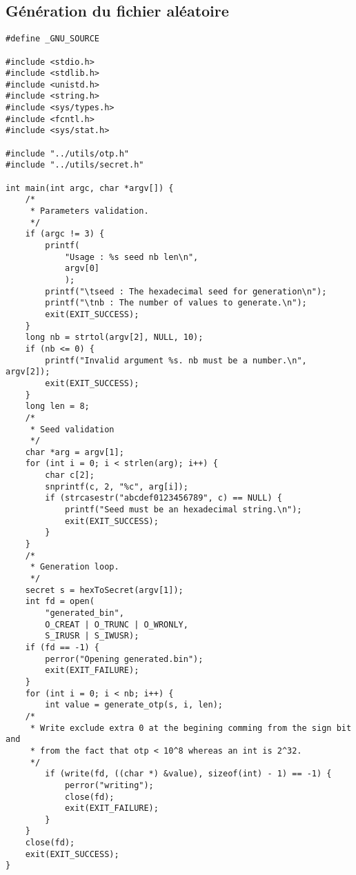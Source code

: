 \documentclass{"../../res/univ-projet"}
\begin{document}
	\newpage
	\begin{appendices}
	\chapter{Génération du fichier aléatoire}
		\lstset{language=C}
		\begin{lstlisting}
#define _GNU_SOURCE

#include <stdio.h>
#include <stdlib.h>
#include <unistd.h>
#include <string.h>
#include <sys/types.h>
#include <fcntl.h>
#include <sys/stat.h>

#include "../utils/otp.h"
#include "../utils/secret.h"

int main(int argc, char *argv[]) {
    /*
     * Parameters validation.
     */
    if (argc != 3) {
        printf(
            "Usage : %s seed nb len\n",
            argv[0]
            );
        printf("\tseed : The hexadecimal seed for generation\n");
        printf("\tnb : The number of values to generate.\n");
        exit(EXIT_SUCCESS);
    }
    long nb = strtol(argv[2], NULL, 10);
    if (nb <= 0) {
        printf("Invalid argument %s. nb must be a number.\n", argv[2]);
        exit(EXIT_SUCCESS);
    }
    long len = 8;
    /*
     * Seed validation
     */
    char *arg = argv[1];
    for (int i = 0; i < strlen(arg); i++) {
        char c[2];
        snprintf(c, 2, "%c", arg[i]);
        if (strcasestr("abcdef0123456789", c) == NULL) {
            printf("Seed must be an hexadecimal string.\n");
            exit(EXIT_SUCCESS);
        }
    }
    /*
     * Generation loop.
     */
    secret s = hexToSecret(argv[1]);
    int fd = open(
        "generated_bin",
        O_CREAT | O_TRUNC | O_WRONLY,
        S_IRUSR | S_IWUSR);
    if (fd == -1) {
        perror("Opening generated.bin");
        exit(EXIT_FAILURE);
    }
    for (int i = 0; i < nb; i++) {
        int value = generate_otp(s, i, len);
    /*
     * Write exclude extra 0 at the begining comming from the sign bit and
     * from the fact that otp < 10^8 whereas an int is 2^32.
     */
        if (write(fd, ((char *) &value), sizeof(int) - 1) == -1) {
            perror("writing");
            close(fd);
            exit(EXIT_FAILURE);
        }
    }
    close(fd);
    exit(EXIT_SUCCESS);
}
		\end{lstlisting}
	\end{appendices}  
\end{document}
